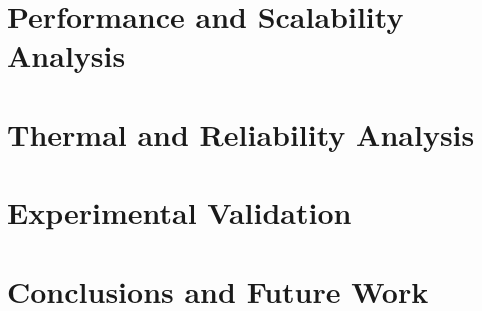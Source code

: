 \documentclass[conference]{IEEEtran}
\begin{document}
\section{Performance and Scalability Analysis}


\section{Thermal and Reliability Analysis}


\section{Experimental Validation}


\section{Conclusions and Future Work}




\end{document}

